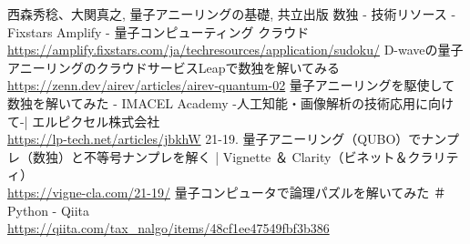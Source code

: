 \documentclass[uplatex,dvipdfmx,a4paper,11pt,oneside,openany]{jsbook}
\begin{document}
\begin{thebibliography}{9}
   西森秀稔、大関真之, 量子アニーリングの基礎, 共立出版
   数独 - 技術リソース - Fixstars Amplify - 量子コンピューティング クラウド\\ \url{https://amplify.fixstars.com/ja/techresources/application/sudoku/}
   D-waveの量子アニーリングのクラウドサービスLeapで数独を解いてみる\\
  \url{https://zenn.dev/airev/articles/airev-quantum-02}
   量子アニーリングを駆使して数独を解いてみた - IMACEL Academy -人工知能・画像解析の技術応用に向けて-| エルピクセル株式会社\\
\url{https://lp-tech.net/articles/jbkhW}
   21-19. 量子アニーリング（QUBO）でナンプレ（数独）と不等号ナンプレを解く | Vignette ＆ Clarity（ビネット＆クラリティ）\\
\url{https://vigne-cla.com/21-19/}
 量子コンピュータで論理パズルを解いてみた ＃Python - Qiita\\
\url{https://qiita.com/tax_nalgo/items/48cf1ee47549fbf3b386}
\end{thebibliography}
\end{document}
